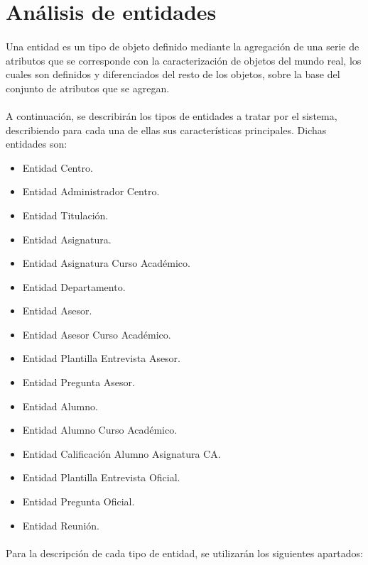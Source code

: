 \section{Análisis de entidades}

   \paragraph{}Una entidad es un tipo de objeto definido mediante la agregación
   de una serie de atributos que se corresponde con la caracterización de
   objetos del mundo real, los cuales son definidos y diferenciados del resto de
   los objetos, sobre la base del conjunto de atributos que se agregan.

   \paragraph{}A continuación, se describirán los tipos de entidades a tratar
   por el sistema, describiendo para cada una de ellas sus características
   principales. Dichas entidades son:

   \begin{itemize}
    \item Entidad Centro.
    \item Entidad Administrador Centro.
    \item Entidad Titulación.
    \item Entidad Asignatura.
    \item Entidad Asignatura Curso Académico.
    \item Entidad Departamento.
    \item Entidad Asesor.
    \item Entidad Asesor Curso Académico.
    \item Entidad Plantilla Entrevista Asesor.
    \item Entidad Pregunta Asesor.
    \item Entidad Alumno.
    \item Entidad Alumno Curso Académico.
    \item Entidad Calificación Alumno Asignatura CA.
    \item Entidad Plantilla Entrevista Oficial.
    \item Entidad Pregunta Oficial.
    \item Entidad Reunión.
   \end{itemize}

   \paragraph{}Para la descripción de cada tipo de entidad, se utilizarán los
   siguientes apartados:

